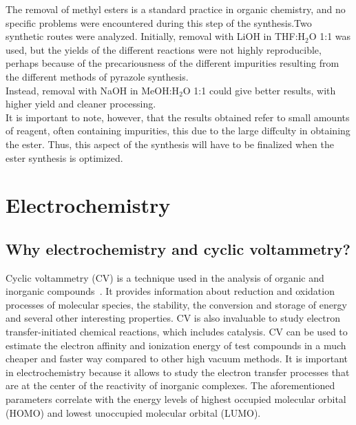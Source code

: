 \documentclass[../Master.tex]{subfiles}
\begin{document}
The removal of methyl esters is a standard practice in organic chemistry, and no specific problems were encountered during this step of the synthesis.Two synthetic routes were analyzed.
Initially, removal with LiOH in THF:H$_2$O 1:1 was used, but the yields of the different reactions were not highly reproducible, perhaps because of the precariousness of the different impurities resulting from the different methods of pyrazole synthesis. \\
Instead, removal with NaOH in MeOH:H$_{2}$O 1:1 could give better results, with higher yield and cleaner processing. \\
It is important to note, however, that the results obtained refer to small amounts of reagent, often containing impurities, this due to the large diffculty in obtaining the ester. Thus, this aspect of the synthesis will have to be finalized when the ester synthesis is optimized.



\newpage\section{Electrochemistry}\label{sec:electrochemistry}

\subsection{Why electrochemistry and cyclic voltammetry?}\label{sec:elect-intro}

Cyclic voltammetry (CV) is a technique used in the analysis of organic and inorganic compounds\ \cite{elgrishi_practical_2018}. It provides information about reduction and oxidation processes of molecular species, the stability, the conversion and storage of energy and several other interesting properties. CV is also invaluable to study electron transfer-initiated chemical reactions, which includes catalysis. CV can be used to estimate the electron affinity and ionization energy of test compounds in a much cheaper and faster way compared to other high vacuum methods. It is important in electrochemistry because it allows to study the electron transfer processes that are at the center of the reactivity of inorganic complexes.
The aforementioned parameters correlate with the energy levels of highest occupied molecular orbital (HOMO) and lowest unoccupied molecular orbital (LUMO).
\end{document}
